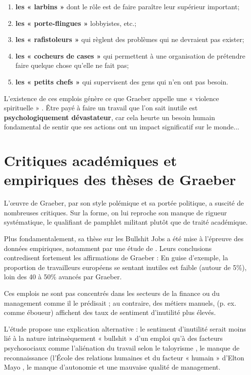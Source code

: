 \begin{enumerate}
    \item \textbf{les « larbins »}  dont le rôle est de faire paraître leur supérieur important;
    \item \textbf{les « porte-flingues  »}  lobbyistes, etc.; 
    \item \textbf{les « rafistoleurs »}  qui règlent des problèmes qui ne devraient pas exister;
    \item \textbf{les « cocheurs de cases »}  qui permettent à une organisation de prétendre faire quelque chose qu'elle ne fait pas;
    \item \textbf{ les « petits chefs »}  qui supervisent des gens qui n'en ont pas besoin.
\end{enumerate}
L'existence de ces emplois génère ce que Graeber appelle une « violence spirituelle » . Être payé à faire un travail que l'on sait inutile est \textbf{psychologiquement dévastateur}, car cela heurte un besoin humain fondamental de sentir que ses actions ont un impact significatif sur le monde...

\section{Critiques académiques et empiriques des thèses de Graeber}

L'œuvre de Graeber, par son style polémique et sa portée politique, a suscité de nombreuses critiques. Sur la forme, on lui reproche son manque de rigueur systématique, le qualifiant de pamphlet militant plutôt que de traité académique.

Plus fondamentalement, sa thèse sur les Bullshit Jobs a été mise à l'épreuve des données empiriques, notamment par une étude de \citep{SoffiaWoodBurchell2021}. Leurs conclusions contredisent fortement les affirmations de Graeber :
En guise d'exemple, la proportion de travailleurs européens se sentant inutiles est faible (autour de 5\%), loin des 40 à 50\% avancés par Graeber.

Ces emplois ne sont pas concentrés dans les secteurs de la finance ou du management comme il le prédisait ; au contraire, des métiers manuels, (p. ex. comme éboueur) affichent des taux de sentiment d'inutilité plus élevés.

L'étude propose une explication alternative : le sentiment d'inutilité serait moins lié à la nature intrinsèquement « bullshit »  d'un emploi qu'à des facteurs psychosociaux comme l'aliénation du travail selon le taloyrisme \citep{taylor1911principles} , le manque de reconnaissance (l'École des relations humaines et du facteur « humain » d'Elton Mayo \citep{mayo1933human} , le manque d'autonomie et une mauvaise qualité de management.

